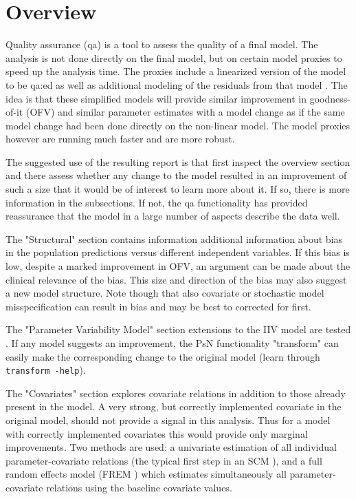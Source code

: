 



\maketitle
\newcommand{\guidetoolname}{qa}


\section{Overview}
Quality assurance (qa) is a tool to assess the quality of a final model. The analysis is not done directly on the final model, but on certain model proxies to speed up the analysis time.
The proxies include a linearized version of the model to be qa:ed as well as additional modeling of the residuals from that model \cite{Khandelwal, Svensson, Ibrahim}. The idea is that these simplified models will provide similar improvement in goodness-of-it (OFV) and similar parameter estimates with a model change as if the same model change had been done directly on the non-linear model. The model proxies however are running much faster and are more robust. 

The suggested use of the resulting report is that first inspect the overview section and there assess whether any change to the model resulted in an improvement of such a size that it would be of interest to learn more about it. If so, there is more information in the subsections. If not, the qa functionality has provided reassurance that the model in a large number of aspects describe the data well. 

The "Structural" section contains information additional information about bias in the population predictions versus different independent variables.  If this bias is low, despite a marked improvement in OFV, an argument can be made about the clinical relevance of the bias. This size and direction of the bias may also suggest a new model structure. Note though that also covariate or stochastic model misspecification can result in bias and may be best to corrected for first. 

The "Parameter Variability Model" section extensions to the IIV model are tested \cite{Svensson, Petersson}. If any model suggests an improvement, the PsN functionality "transform" can easily make the corresponding change to the original model (learn through \verb|transform -help|).

The "Covariates" section explores covariate relations in addition to those already present in the model. A very strong, but correctly implemented covariate in the original model, should not provide a signal in this analysis. Thus for a model with correctly implemented covariates this would provide only marginal improvements. Two methods are used: a univariate estimation of all individual parameter-covariate relations (the typical first step in an SCM \cite{Jonsson2}), and a full random effects model (FREM \cite{Karlsson, Yun, Yngman}) which estimates simultaneously all parameter-covariate relations using the baseline covariate values.

